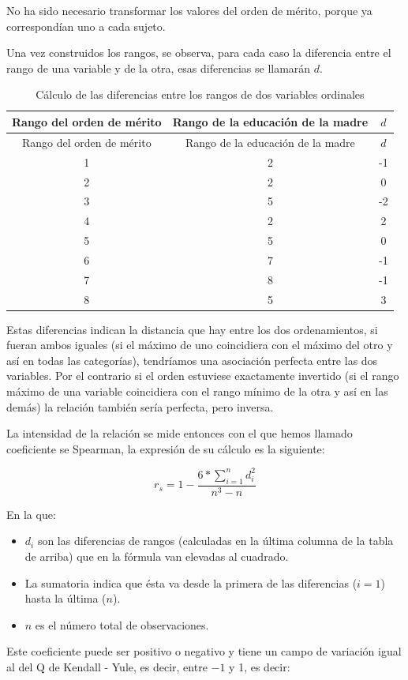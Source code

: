 \documentclass[]{book}
\begin{document}
No ha sido necesario transformar los valores del orden de mérito, porque ya correspondían uno a cada sujeto.

Una vez construidos los rangos, se observa, para cada caso la diferencia
entre el rango de una variable y de la otra, esas diferencias se
llamarán \(d\).

\begin{longtable}[]{@{}ccc@{}}
\caption{\label{tab:unnamed-chunk-143}Cálculo de las diferencias entre los rangos de dos variables ordinales}\tabularnewline
\toprule
Rango del orden de mérito & Rango de la educación de la madre & \(d\)\tabularnewline
\midrule
\endfirsthead
\toprule
Rango del orden de mérito & Rango de la educación de la madre & \(d\)\tabularnewline
\midrule
\endhead
1 & 2 & -1\tabularnewline
2 & 2 & 0\tabularnewline
3 & 5 & -2\tabularnewline
4 & 2 & 2\tabularnewline
5 & 5 & 0\tabularnewline
6 & 7 & -1\tabularnewline
7 & 8 & -1\tabularnewline
8 & 5 & 3\tabularnewline
\bottomrule
\end{longtable}

Estas diferencias indican la distancia que hay entre los dos
ordenamientos, si fueran ambos iguales (si el máximo de uno coincidiera
con el máximo del otro y así en todas las categorías), tendríamos una
asociación perfecta entre las dos variables. Por el contrario si el
orden estuviese exactamente invertido (si el rango máximo de una
variable coincidiera con el rango mínimo de la otra y así en las demás)
la relación también sería perfecta, pero inversa.

La intensidad de la relación se mide entonces con el que hemos llamado
coeficiente se Spearman, la expresión de su cálculo es la siguiente:

\[r_{s} = 1 - \frac{6*\sum_{i = 1}^{n}d_{i}^{2}}{n^{3} - n}\]

En la que:

\begin{itemize}
\item
  \(d_{i}\) son las diferencias de rangos (calculadas en la última columna de la tabla de arriba) que en la fórmula van elevadas al cuadrado.
\item
  La sumatoria indica que ésta va desde la primera de las diferencias (\(i=1\)) hasta la última (\(n\)).
\item
  \(n\) es el número total de observaciones.
\end{itemize}

Este coeficiente puede ser positivo o negativo y tiene un campo de
variación igual al del Q de Kendall - Yule, es decir, entre \(-1\) y 1, es decir:
\end{document}
